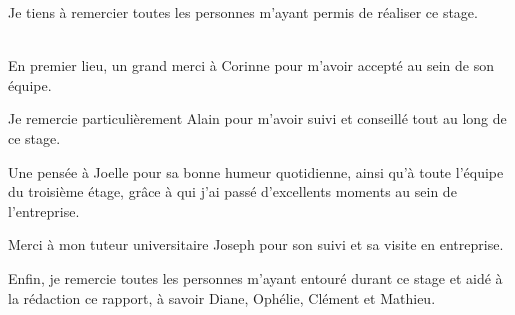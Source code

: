 Je tiens à remercier toutes les personnes m'ayant permis de réaliser ce stage.\\~

En premier lieu, un grand merci à Corinne  pour m'avoir accepté au sein de son équipe.

Je remercie particulièrement Alain  pour m'avoir suivi et conseillé tout au long de ce stage.

Une pensée à Joelle  pour sa bonne humeur quotidienne, ainsi qu'à toute l'équipe du troisième étage, grâce à qui j'ai passé d'excellents moments au sein de l'entreprise.

Merci à mon tuteur universitaire Joseph  pour son suivi et sa visite en entreprise.

Enfin, je remercie toutes les personnes m'ayant entouré durant ce stage et aidé à la rédaction ce rapport, à savoir Diane, Ophélie, Clément et Mathieu.
